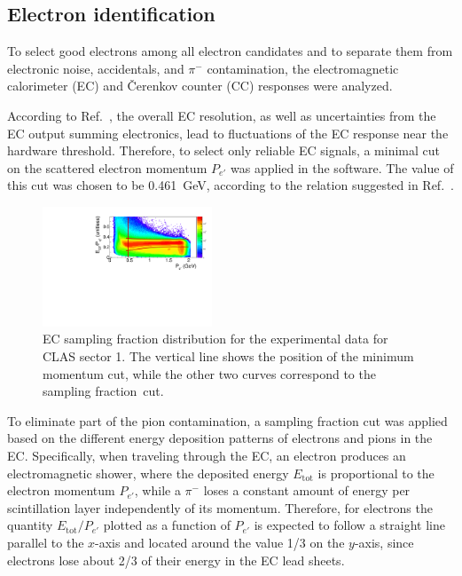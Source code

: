 \documentclass[prc,twocolumn,superscriptaddress,showpacs,amssymb,amsmath,amsfonts,aps,nofootinbib]{revtex4-1}
\begin{document}
\subsection{Electron identification}

To select good electrons among all electron candidates and to separate them from electronic noise, accidentals, and $\pi^{-}$ contamination, the electromagnetic calorimeter (EC) and \v Cerenkov counter (CC) responses were analyzed.

According to Ref.\!~\cite{Egian:007}, the overall EC resolution, as well as uncertainties from the EC output summing electronics, lead to fluctuations of the EC response near the hardware threshold. Therefore, to select only reliable EC signals, a minimal cut on the scattered electron momentum $P_{e'}$ was applied in the software. The value of this cut was chosen to be 0.461~GeV, according to the relation suggested in Ref.\!~\cite{Egian:007}.

\begin{figure}[htp]
\begin{center}
 \includegraphics[width=0.45\textwidth,keepaspectratio]{pictures/event_selection/ectot.pdf}
\caption{EC sampling fraction distribution for the experimental data for CLAS sector 1. The vertical line shows the position of the minimum momentum cut, while the other two curves correspond to the sampling fraction~cut.}
\label{fig:ec_cut}
\end{center}
\end{figure}

To eliminate part of the pion contamination, a sampling fraction cut was applied based on the different energy deposition patterns of electrons and pions in the EC. Specifically, when traveling through the EC, an electron produces an electromagnetic shower, where the deposited energy $E_{\text{tot}}$ is proportional to the electron momentum $P_{e'}$, while a $\pi^{-}$ loses a constant amount of energy per scintillation layer independently of its momentum. Therefore, for electrons the quantity $E_{\text{tot}}/P_{e'}$ plotted as a function of $P_{e'}$ is expected to follow a straight line parallel to the $x$-axis and located around the value 1/3 on the $y$-axis, since electrons lose about 2/3 of their energy in the EC lead sheets.
\end{document}
